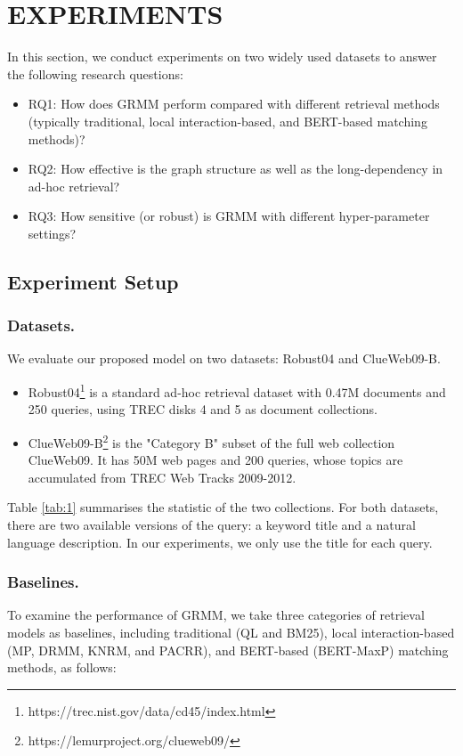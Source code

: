 \section{EXPERIMENTS}
In this section, we conduct experiments on two widely used datasets to answer the following research questions:
\begin{itemize}
	\item RQ1: How does GRMM perform compared with different retrieval methods (typically traditional, local interaction-based, and BERT-based matching methods)?
	\item RQ2: How effective is the graph structure as well as the long-dependency in ad-hoc retrieval?
	\item RQ3: How sensitive (or robust) is GRMM with different hyper-parameter settings?
\end{itemize}

\subsection{Experiment Setup}
\subsubsection{Datasets.}
We evaluate our proposed model on two datasets: Robust04 and ClueWeb09-B.
\begin{itemize}
    \item Robust04\footnote{https://trec.nist.gov/data/cd45/index.html} is a standard ad-hoc retrieval dataset with 0.47M documents and 250 queries, using TREC disks 4 and 5 as document collections.
    \item ClueWeb09-B\footnote{https://lemurproject.org/clueweb09/} is the "Category B" subset of the full web collection ClueWeb09. It has 50M web pages and 200 queries, whose topics are accumulated from TREC Web Tracks 2009-2012.
\end{itemize}
Table \ref{tab:1} summarises the statistic of the two collections. For both datasets, there are two available versions of the query: a keyword title and a natural language description. In our experiments, we only use the title for each query.


\subsubsection{Baselines.}
To examine the performance of GRMM, we take three categories of retrieval models as baselines, including traditional (QL and BM25), local interaction-based (MP, DRMM, KNRM, and PACRR), and BERT-based (BERT-MaxP) matching methods, as follows: 

